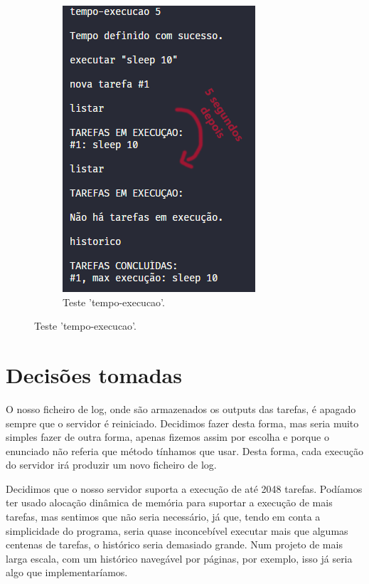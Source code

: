 \documentclass[a4paper]{report}
\begin{document}
\begin{figure}[H]
\begin{subfigure}{.3\textwidth}
			\includegraphics[width=.9\linewidth]{teste3.png}
			\caption{Teste 'tempo-execucao'.}
			\label{fig:test3}
		\end{subfigure}
	\end{figure}
		
	\chapter{Decisões tomadas}
	
	O nosso ficheiro de log, onde são armazenados os outputs das tarefas, é apagado sempre que o servidor é reiniciado. Decidimos fazer desta forma, mas seria muito simples fazer de outra forma, apenas fizemos assim por escolha e porque o enunciado não referia que método tínhamos que usar. Desta forma, cada execução do servidor irá produzir um novo ficheiro de log.
	
	Decidimos que o nosso servidor suporta a execução de até 2048 tarefas. Podíamos ter usado alocação dinâmica de memória para suportar a execução de mais tarefas, mas sentimos que não seria necessário, já que, tendo em conta a simplicidade do programa, seria quase inconcebível executar mais que algumas centenas de tarefas, o histórico seria demasiado grande. Num projeto de mais larga escala, com um histórico navegável por páginas, por exemplo, isso já seria algo que implementaríamos.
	
\end{document}

